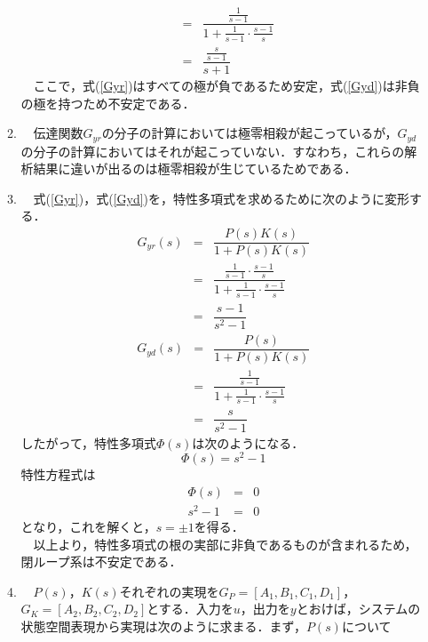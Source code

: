 \documentclass[a4paper,11pt]{jarticle}
\begin{document}
\begin{enumerate}
\begin{enumerate}[(1)]
\begin{eqnarray}
	            & = & \dfrac{ \frac{1}{s-1} }{ 1 + \frac{1}{s-1} \cdot \frac{s-1}{s} } \nonumber \\
	            & = & \dfrac{\frac{s}{s-1}}{s+1}
	  \label{Gyd}
	 \end{eqnarray}
	 \ \ ここで，式(\ref{Gyr})はすべての極が負であるため安定，式(\ref{Gyd})は非負の極を持つため不安定である．
   \item \ \ 伝達関数$ G_{yr} $の分子の計算においては極零相殺が起こっているが，$ G_{yd} $の分子の計算においてはそれが起こっていない．すなわち，これらの解析結果に違いが出るのは極零相殺が生じているためである．
   \item \ \ 式(\ref{Gyr})，式(\ref{Gyd})を，特性多項式を求めるために次のように変形する．
	 \begin{eqnarray}
	  G_{yr}(s) & = & \dfrac{P(s)K(s)}{1 + P(s)K(s)} \nonumber \\
	            & = & \dfrac{ \frac{1}{s-1} \cdot \frac{s-1}{s} }{ 1 + \frac{1}{s-1} \cdot \frac{s-1}{s} } \nonumber\\
	            & = & \dfrac{s-1}{s^2-1}
	  \label{Gyr2}
	 \end{eqnarray}
	 \begin{eqnarray}
	  G_{yd}(s) & = & \dfrac{P(s)}{1 + P(s)K(s)} \nonumber \\
	            & = & \dfrac{ \frac{1}{s-1} }{ 1 + \frac{1}{s-1} \cdot \frac{s-1}{s} } \nonumber\\
	            & = & \dfrac{s}{s^2-1}
	  \label{Gyr2}
	 \end{eqnarray}
	 したがって，特性多項式$ \Phi (s) $は次のようになる．
	 \begin{equation}
	  \Phi (s) = s^2 - 1
	 \end{equation}
	 特性方程式は
	 \begin{eqnarray*}
	  \Phi (s) & = & 0 \\
	  s^2 -1 & = & 0
	 \end{eqnarray*}
	 となり，これを解くと，$ s = \pm 1 $を得る．\\
	 \ \ 以上より，特性多項式の根の実部に非負であるものが含まれるため，閉ループ系は不安定である．
   \item \ \ $ P(s) $，$ K(s) $それぞれの実現を$ G_P = \left[ A_1 , B_1 , C_1, D_1 \right] $，$ G_K = \left[ A_2, B_2, C_2, D_2 \right] $とする．入力を$ u $，出力を$ y $とおけば，システムの状態空間表現から実現は次のように求まる．まず，$ P(s) $について

\end{enumerate}
\end{enumerate}
\end{document}
